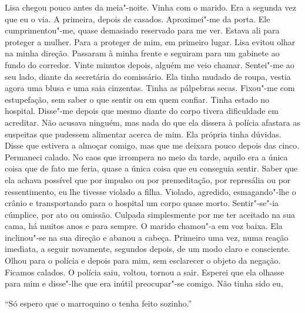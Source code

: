 Lisa chegou pouco antes da meia"-noite. Vinha com o marido. Era a
segunda vez que eu o via. A primeira, depois de casados. Aproximei"-me
da porta. Ele cumprimentou"-me, quase demasiado reservado para me ver.
Estava ali para proteger a mulher. Para a proteger de mim, em primeiro
lugar. Lisa evitou olhar na minha direção. Passaram à minha frente e
seguiram para um gabinete ao fundo do corredor. Vinte minutos depois,
alguém me veio chamar. Sentei"-me ao seu lado, diante da secretária do
comissário. Ela tinha mudado de roupa, vestia agora uma blusa e uma saia
cinzentas. Tinha as pálpebras secas. Fixou"-me com estupefação, sem
saber o que sentir ou em quem confiar. Tinha estado no hospital.
Disse"-me depois que mesmo diante do corpo tivera dificuldade em
acreditar. Não acusava ninguém, mas nada do que ela dissera à polícia
afastara as suspeitas que pudessem alimentar acerca de mim. Ela própria
tinha dúvidas. Disse que estivera a almoçar comigo, mas que me deixara
pouco depois das cinco. Permaneci calado. No caos que irrompera no meio
da tarde, aquilo era a única coisa que de fato me feria, quase a única
coisa que eu conseguia sentir. Saber que ela achava possível que por
impulso ou por premeditação, por represália ou por ressentimento, eu lhe
tivesse violado a filha. Violado, agredido, esmagando"-lhe o crânio e
transportando para o hospital um corpo quase morto. Sentir"-se"-ia
cúmplice, por ato ou omissão. Culpada simplesmente por me ter aceitado
na sua cama, há muitos anos e para sempre. O marido chamou"-a em voz
baixa. Ela inclinou"-se na sua direção e abanou a cabeça. Primeiro uma
vez, numa reação imediata, a seguir novamente, segundos depois, de um
modo claro e consciente. Olhou para o polícia e depois para mim, sem
esclarecer o objeto da negação. Ficamos calados. O polícia saiu,
voltou, tornou a sair. Esperei que ela olhasse para mim e disse"-lhe que
era inútil preocupar"-se comigo. Não tinha sido eu,

``Só espero que o marroquino o tenha feito sozinho.''

